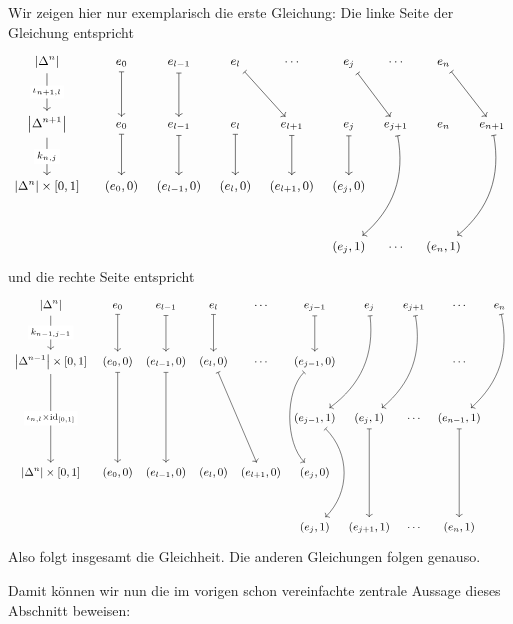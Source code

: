 \begin{beweis}
	Wir zeigen hier nur exemplarisch die erste Gleichung:
	Die linke Seite der Gleichung entspricht
		\[
			\begin{tikzcd}[row sep=2.8em, column sep=0.5em, font=\small]
				\abs*{\Delta^n} \dar["\iota_{n+1,l}" description] && e_0 \dar[mapsto] & e_{l-1} \dar[mapsto] & e_l \drar[mapsto]& \cdots & e_j \drar[mapsto]& \cdots 
				& e_n \drar[mapsto]& \\
				\abs*{\Delta^{n+1}} \dar["k_{n,j}" description] && e_0 \dar[mapsto] & e_{l-1} \dar[mapsto] & e_l \dar[mapsto] & e_{l+1} \dar[mapsto]& e_{j} \dar[mapsto] 
				& e_{j+1} \arrow[ddl,mapsto, bend left] & e_n & e_{n+1} \arrow[ddl,mapsto, bend left] \\
				\abs*{\Delta^{n}} \times [0,1] && (e_0,0) & (e_{l-1},0) & (e_l,0) & (e_{l+1},0)& (e_j,0) & & \\
				 &&  &  &  & & (e_j,1) & \cdots & (e_n,1)
			\end{tikzcd}
		\]
		und die rechte Seite entspricht
		\[
			\begin{tikzcd}[row sep=2.8em, column sep=0.2em, font=\small]
				\abs*{\Delta^n} \dar["k_{n-1,j-1}" description] && e_0 \dar[mapsto] & e_{l-1} \dar[mapsto] & e_l \dar[mapsto]& \cdots 
				& e_{j-1} \dar[mapsto]& e_j \arrow[ddl,bend left,mapsto]& e_{j+1} \arrow[ddl,bend left,mapsto] & \cdots & e_n \arrow[ddl,mapsto,bend left] \\
				\abs*{\Delta^{n-1}} \times [0,1] \arrow[dd,"\iota_{n,l}\times \id_{[0,1]}" description] && (e_0,0) \arrow[dd,mapsto] & (e_{l-1},0) \arrow[dd,mapsto] 
				& (e_l,0) \arrow[ddr, mapsto] & \cdots & (e_{j-1},0) \arrow[dd, controls={+(225:1.2) and +(135:1.2)}, mapsto] &   &  & \cdots \\
				 &&&&&& (e_{j-1},1) \arrow[dd, controls={+(-45:1) and +(45:1)}, end anchor={[xshift=2ex]north}, mapsto] & (e_{j},1) \arrow[dd, mapsto] & \cdots 
				 & (e_{n-1},1) \arrow[dd,mapsto]\\
				 \abs*{\Delta^n} \times [0,1] && (e_0,0)  & (e_{l-1},0) & (e_l,0) & (e_{l+1},0) &(e_j,0) & & & \\
				 &&&&&& (e_j,1) & (e_{j+1},1) & \cdots & (e_n,1)
			\end{tikzcd}
		\]
		Also folgt insgesamt die Gleichheit. Die anderen Gleichungen folgen genauso.
\end{beweis}

Damit können wir nun die im vorigen schon vereinfachte zentrale Aussage dieses Abschnitt beweisen:

